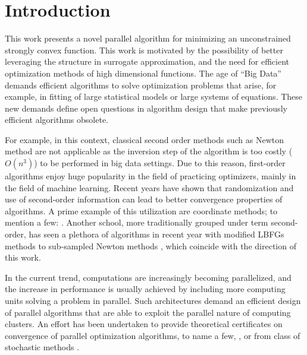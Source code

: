 \documentclass[11pt]{article}
\begin{document}
%	
%	
%	
	{\footnotesize
		\tableofcontents
	}


	\newpage
	
		
	
	\section{Introduction}
	This work presents a novel parallel algorithm for minimizing an unconstrained strongly convex function.  This work is motivated by the possibility of better leveraging the structure in surrogate approximation, and the need for efficient optimization methods of high dimensional functions. The age of ``Big Data'' demands efficient algorithms to solve optimization problems that arise, for example, in fitting of large statistical models or large systems of equations. These new demands define open questions in algorithm design that make previously efficient algorithms obsolete. 
	
	For example, in this context, classical second order methods such as Newton method are not applicable as the inversion step of the algorithm is too costly ($O(n^3)$) to be performed in big data settings. Due to this reason, first-order algorithms enjoy huge popularity in the field of practicing optimizers, mainly in the field of machine learning. Recent years have shown that randomization and use of second-order information can lead to better convergence properties of algorithms. A prime example of this utilization are coordinate methods; to mention a few: \cite{NSYNC,PCDM,QUARTZ,APPROX}. Another school, more traditionally grouped under term second-order, has seen a plethora of algorithms in recent year with modified LBFGs \cite{Liu1989,Gower2016} methods to sub-sampled Newton methods \cite{Pilanci2015,Roosta-Khorasani2016,Roosta-Khorasani2016a,Erdogdu2015}, which coincide with the direction of this work. 
	
	In the current trend, computations are increasingly becoming parallelized, and the increase in performance is usually achieved by including more computing units solving a problem in parallel. Such architectures demand an efficient design of parallel algorithms that are able to exploit the parallel nature of computing clusters. An effort has been undertaken to provide theoretical certificates on convergence of parallel optimization algorithms, to name a few, \cite{PCDM,HYDRA}, or from class of stochastic methods \cite{Zinkevich2010,Recht2011}.
	
\end{document}
